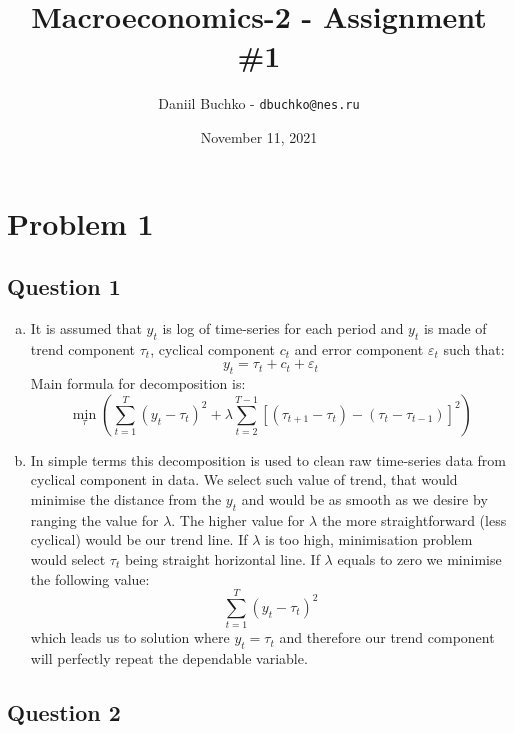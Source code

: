 \documentclass[11pt, oneside]{article}
\title{Macroeconomics-2 - Assignment \#1}
\author{Daniil Buchko - \texttt{dbuchko@nes.ru}}
\date{November 11, 2021}
\begin{document}
\maketitle

\section*{Problem 1}

\subsection*{Question 1}

\begin{enumerate}[(a)]
	\item It is assumed that $ y_{t} $ is log of time-series for each period and $ y_{t} $ is made of trend component $ \tau_{t} $, cyclical component $ c_{t} $ and error component $ \varepsilon_{t} $ such that:
	\[y_{t} = \tau_{t} + c_{t} + \varepsilon_{t}\]
	 Main formula for decomposition is:
	\[
	\min_{\tau} \left( \sum_{t=1}^{T} (y_{t} - \tau_{t})^{2} + \lambda \sum_{t=2}^{T-1} [(\tau_{t+1} - \tau_{t}) - (\tau_{t} - \tau_{t-1}) ]^{2} \right)
	\]
	\item In simple terms this decomposition is used to clean raw time-series data from cyclical component in data. We select such value of trend, that would minimise the distance from the $ y_{t} $ and would be as smooth as we desire by ranging the value for $ \lambda $. The higher value for $ \lambda $ the more straightforward (less cyclical) would be our trend line. If $ \lambda $ is too high, minimisation problem would select $ \tau_{t} $ being straight horizontal line. If $ \lambda  $ equals to zero we minimise the following value:
	\[
	\sum_{t=1}^{T} (y_{t} - \tau_{t})^{2}
	\]
	which leads us to solution where $ y_{t} = \tau_{t} $ and therefore our trend component will perfectly repeat the dependable variable.
\end{enumerate}
	

\subsection*{Question 2}
\end{document}
